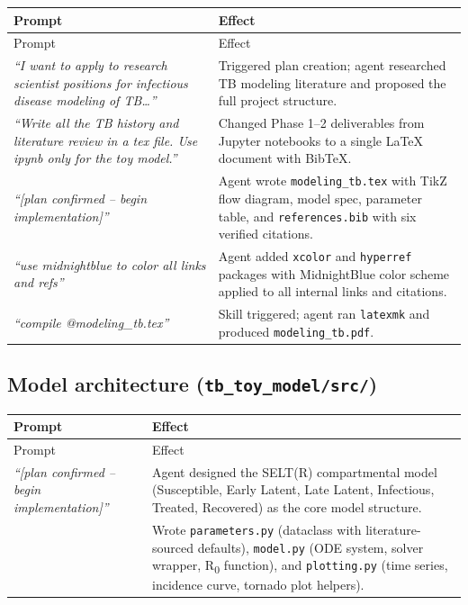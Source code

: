 \documentclass[11pt]{article}
\begin{document}
\begin{longtable}{@{}p{6cm}p{7.3cm}@{}}
\toprule
Prompt & Effect \\
\midrule
\endfirsthead
\toprule
Prompt & Effect \\
\midrule
\endhead
\textit{``I want to apply to research scientist positions for infectious disease modeling of TB\ldots''} & Triggered plan creation; agent researched TB modeling literature and proposed the full project structure. \\
\textit{``Write all the TB history and literature review in a tex file. Use ipynb only for the toy model.''} & Changed Phase 1--2 deliverables from Jupyter notebooks to a single LaTeX document with BibTeX. \\
\textit{``[plan confirmed -- begin implementation]''} & Agent wrote \texttt{modeling\_tb.tex} with TikZ flow diagram, model spec, parameter table, and \texttt{references.bib} with six verified citations. \\
\textit{``use midnightblue to color all links and refs''} & Agent added \texttt{xcolor} and \texttt{hyperref} packages with MidnightBlue color scheme applied to all internal links and citations. \\
\textit{``compile @modeling\_tb.tex''} & Skill triggered; agent ran \texttt{latexmk} and produced \texttt{modeling\_tb.pdf}. \\
\bottomrule
\end{longtable}

\subsection{Model architecture (\texttt{tb\_toy\_model/src/})}

\begin{longtable}{@{}p{6cm}p{7.3cm}@{}}
\toprule
Prompt & Effect \\
\midrule
\endfirsthead
\toprule
Prompt & Effect \\
\midrule
\endhead
\textit{``[plan confirmed -- begin implementation]''} & Agent designed the SELT(R) compartmental model (Susceptible, Early Latent, Late Latent, Infectious, Treated, Recovered) as the core model structure. \\
& Wrote \texttt{parameters.py} (dataclass with literature-sourced defaults), \texttt{model.py} (ODE system, solver wrapper, R\textsubscript{0} function), and \texttt{plotting.py} (time series, incidence curve, tornado plot helpers). \\
\bottomrule
\end{longtable}
\end{document}
